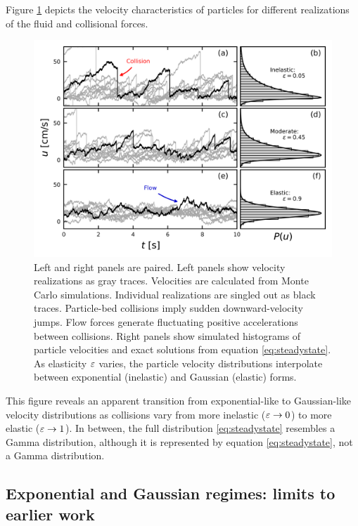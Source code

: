Figure \ref{fig:fig2} depicts the velocity characteristics of particles for different realizations of the fluid and collisional forces.
\begin{figure}
	\centerline{\includegraphics{./figures/ch5/Fig2pdfs.png}}
	\caption{Left and right panels are paired. Left panels show velocity realizations as gray traces. Velocities are calculated from Monte Carlo simulations. Individual realizations are singled out as black traces. Particle-bed collisions imply sudden downward-velocity jumps. Flow forces generate fluctuating positive accelerations between collisions. Right panels show simulated histograms of particle velocities and exact solutions from equation \ref{eq:steadystate}. As elasticity $\varepsilon$ varies, the particle velocity distributions interpolate between exponential (inelastic) and Gaussian (elastic) forms.}
	\label{fig:fig2}
\end{figure}
This figure reveals an apparent transition from exponential-like to Gaussian-like velocity distributions as  collisions vary from more inelastic ($\varepsilon \rightarrow 0$) to more elastic ($\varepsilon \rightarrow 1$). In between, the full distribution \ref{eq:steadystate} resembles a Gamma distribution, although it is represented by equation \ref{eq:steadystate}, not a Gamma distribution.


\subsection{Exponential and Gaussian regimes: limits to earlier work}
\label{sec:langmodelcomparison}

